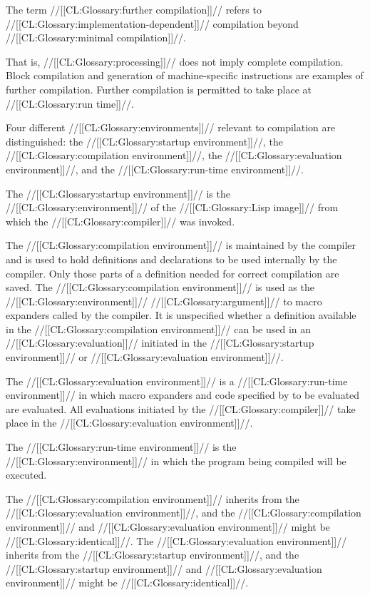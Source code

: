 The term //[[CL:Glossary:further compilation]]// refers to //[[CL:Glossary:implementation-dependent]]// compilation beyond //[[CL:Glossary:minimal compilation]]//.

That is, //[[CL:Glossary:processing]]// does not imply complete compilation. Block compilation and generation of machine-specific instructions are  examples of further compilation. Further compilation is permitted to take place at //[[CL:Glossary:run time]]//.

Four different //[[CL:Glossary:environments]]// relevant to compilation are distinguished:
  the //[[CL:Glossary:startup environment]]//,
  the //[[CL:Glossary:compilation environment]]//,
  the //[[CL:Glossary:evaluation environment]]//, and
  the //[[CL:Glossary:run-time environment]]//.

The //[[CL:Glossary:startup environment]]// is the //[[CL:Glossary:environment]]// of the //[[CL:Glossary:Lisp image]]//  from which the //[[CL:Glossary:compiler]]// was invoked.

The //[[CL:Glossary:compilation environment]]// is maintained by the compiler and is used to hold definitions and declarations to be used internally by the compiler.  Only those parts of a definition needed for correct compilation are saved. The //[[CL:Glossary:compilation environment]]// is used as the //[[CL:Glossary:environment]]// //[[CL:Glossary:argument]]// to macro expanders called by the compiler. It is unspecified whether a definition available in the //[[CL:Glossary:compilation environment]]// can be used in an //[[CL:Glossary:evaluation]]// initiated in the //[[CL:Glossary:startup environment]]// or //[[CL:Glossary:evaluation environment]]//.

The //[[CL:Glossary:evaluation environment]]// is a //[[CL:Glossary:run-time environment]]// in which macro expanders and code specified by  to be evaluated are evaluated.  All evaluations initiated by the //[[CL:Glossary:compiler]]// take place in the //[[CL:Glossary:evaluation environment]]//.

The //[[CL:Glossary:run-time environment]]// is the  //[[CL:Glossary:environment]]// in which the program being compiled will be executed.

The //[[CL:Glossary:compilation environment]]// inherits from the //[[CL:Glossary:evaluation environment]]//, and the //[[CL:Glossary:compilation environment]]// and //[[CL:Glossary:evaluation environment]]//  might be //[[CL:Glossary:identical]]//. The //[[CL:Glossary:evaluation environment]]// inherits from the //[[CL:Glossary:startup environment]]//,  and the //[[CL:Glossary:startup environment]]// and //[[CL:Glossary:evaluation environment]]//  might be //[[CL:Glossary:identical]]//.

